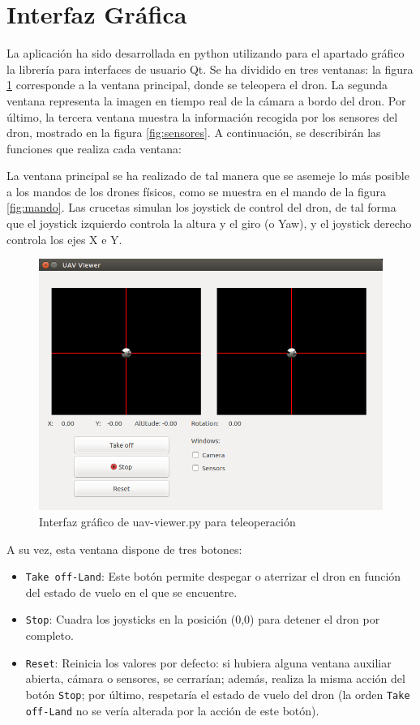 \section{Interfaz Gráfica}

La aplicación ha sido desarrollada en python utilizando para el apartado gráfico la librería
para interfaces de usuario Qt. Se ha dividido en tres ventanas: la figura \ref{fig:interfazUavViewer} corresponde a la ventana principal, donde se teleopera el dron. La segunda ventana representa la imagen en tiempo real de la cámara a bordo del dron. Por último, la tercera ventana muestra la información recogida por los sensores del dron, mostrado en la figura \ref{fig:sensores}. A continuación, se describirán las funciones que realiza cada ventana:

La ventana principal se ha realizado de tal manera que se asemeje lo más posible a los mandos de los drones físicos, como se muestra en el mando de la figura \ref{fig:mando}. Las crucetas simulan los joystick de control del dron, de tal forma que el joystick izquierdo controla la altura y el giro (o Yaw), y el joystick derecho controla los ejes X e Y. 

\begin{figure}[H]
  \centering
  \includegraphics[scale=0.35]{imagenes/Uav_viewer_py.png}
  \caption{Interfaz gráfico de uav-viewer.py para teleoperación}
  \label{fig:interfazUavViewer}
\end{figure}

A su vez, esta ventana dispone de tres botones:
\begin{itemize}
\item \texttt{Take off-Land}: Este botón permite despegar o aterrizar el dron en función del estado de vuelo en el que se encuentre.
\item \texttt{Stop}: Cuadra los joysticks en la posición (0,0) para detener el dron por completo.
\item \texttt{Reset}: Reinicia los valores por defecto: si hubiera alguna ventana auxiliar abierta, cámara o sensores, se cerrarían; además, realiza la misma acción del botón \texttt{Stop}; por último, respetaría el estado de vuelo del dron (la orden \texttt{Take off-Land} no se vería alterada por la acción de este botón).
\end{itemize}


